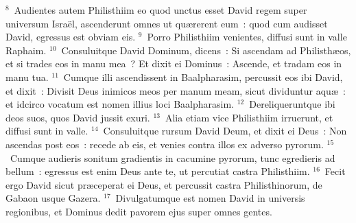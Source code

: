 ${}^{8}$~Audientes autem Philisthiim eo quod unctus esset David regem super universum Isra\"el, ascenderunt omnes ut qu\ae rerent eum~: quod cum audisset David, egressus est obviam eis.
${}^{9}$~Porro Philisthiim venientes, diffusi sunt in valle Raphaim.
${}^{10}$~Consuluitque David Dominum, dicens~: Si ascendam ad Philisth\ae os, et si trades eos in manu mea~? Et dixit ei Dominus~: Ascende, et tradam eos in manu tua.
${}^{11}$~Cumque illi ascendissent in Baalpharasim, percussit eos ibi David, et dixit~: Divisit Deus inimicos meos per manum meam, sicut dividuntur aqu\ae~: et idcirco vocatum est nomen illius loci Baalpharasim.
${}^{12}$~Dereliqueruntque ibi deos suos, quos David jussit exuri.
${}^{13}$~Alia etiam vice Philisthiim irruerunt, et diffusi sunt in valle.
${}^{14}$~Consuluitque rursum David Deum, et dixit ei Deus~: Non ascendas post eos~: recede ab eis, et venies contra illos ex adverso pyrorum.
${}^{15}$~Cumque audieris sonitum gradientis in cacumine pyrorum, tunc egredieris ad bellum~: egressus est enim Deus ante te, ut percutiat castra Philisthiim.
${}^{16}$~Fecit ergo David sicut pr\ae ceperat ei Deus, et percussit castra Philisthinorum, de Gabaon usque Gazera.
${}^{17}$~Divulgatumque est nomen David in universis regionibus, et Dominus dedit pavorem ejus super omnes gentes.

